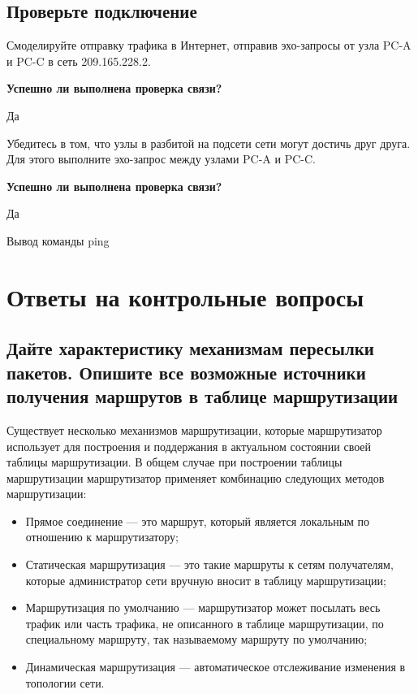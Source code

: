 \subsection{Проверьте подключение}

Смоделируйте отправку трафика в Интернет,
отправив эхо-запросы от узла PC-A и PC-C в сеть 209.165.228.2.

\textbf{Успешно ли выполнена проверка связи?}

Да

Убедитесь в том, что узлы в разбитой на подсети сети могут достичь друг друга.
Для этого выполните эхо-запрос между узлами PC-A и PC-C.

\textbf{Успешно ли выполнена проверка связи?}

Да

\begin{image}
    \caption{Вывод команды ping}
\end{image}

\section{Ответы на контрольные вопросы}

\subsection{Дайте характеристику механизмам пересылки пакетов.
Опишите все возможные источники получения маршрутов
в таблице маршрутизации}

Существует несколько механизмов маршрутизации,
которые маршрутизатор использует для построения
и поддержания в актуальном состоянии своей таблицы маршрутизации.
В общем случае при построении таблицы маршрутизации маршрутизатор
применяет комбинацию следующих методов маршрутизации:

\begin{itemize}
    \item Прямое соединение --- это маршрут, который является локальным
    по отношению к маршрутизатору;
    \item Статическая маршрутизация --- это такие маршруты к сетям получателям,
    которые администратор сети вручную вносит в таблицу маршрутизации;
    \item Маршрутизация по умолчанию --- маршрутизатор может посылать
    весь трафик или часть трафика, не описанного в таблице маршрутизации,
    по специальному маршруту, так называемому маршруту по умолчанию;
    \item Динамическая маршрутизация --- автоматическое отслеживание
    изменения в топологии сети.
\end{itemize}


